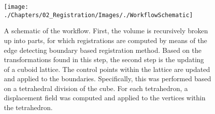 \begin{figure}[!ht]
\centering
\texttt{[image: ./Chapters/02\_Registration/Images/./WorkflowSchematic]}
\caption{
	A schematic of the workflow. First, the volume is recursively broken up into parts, for which registrations are computed by means of the edge detecting boundary based registration method. Based on the transformations found in this step, the second step is the updating of a cuboid lattice. The control points within the lattice are updated and applied to the boundaries. Specifically, this was performed based on a tetrahedral division of the cube. For each tetrahedron, a displacement field was computed and applied to the vertices within the tetrahedron.
}
\label{fig:cubedivision}
\end{figure}